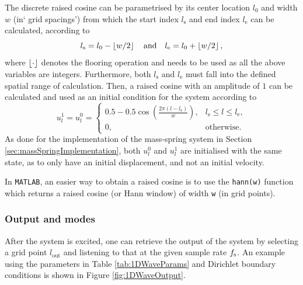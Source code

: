 The discrete raised cosine can be parametrised by its center location $l_0$ and width $w$ (in` grid spacings')  from which the start index $l_\text{s}$ and end index $l_\text{e}$ can be calculated, according to 
\begin{equation}
    l_\text{s} = l_0 - \floor[w/2]\qaq l_\text{e} = l_0 + \floor[w/2],
\end{equation}
where $\floor[\cdot]$ denotes the flooring operation and needs to be used as all the above variables are integers. Furthermore, both $l_\text{s}$ and $l_\text{e}$ must fall into the defined spatial range of calculation. Then, a raised cosine with an amplitude of $1$ can be calculated and used as an initial condition for the system according to
\begin{equation}\label{eq:raisedCos}
    u_l^1 = u_l^0 =
    \begin{cases}
        0.5 - 0.5\cos\left(\frac{2\pi (l - l_\text{s})}{w}\right), & l_\text{s} \leq l \leq l_\text{e},\\
        0, & \text{otherwise}.
    \end{cases}
\end{equation}
As done for the implementation of the mass-spring system in Section \ref{sec:massSpringImplementation}, both $u_l^0$ and $u^1_l$ are initialised with the same state, as to only have an initial displacement, and not an initial velocity. 

In \texttt{MATLAB}, an easier way to obtain a raised cosine is to use the \texttt{hann(w)} function which returns a raised cosine (or Hann window) of width \texttt{w} (in grid points).

\subsubsection{Output and modes}
After the system is excited, one can retrieve the output of the system by selecting a grid point $l_\text{out}$ and listening to that at the given sample rate $f_\text{s}$. An example using the parameters in Table \ref{tab:1DWaveParams} and Dirichlet boundary conditions is shown in Figure \ref{fig:1DWaveOutput}.

